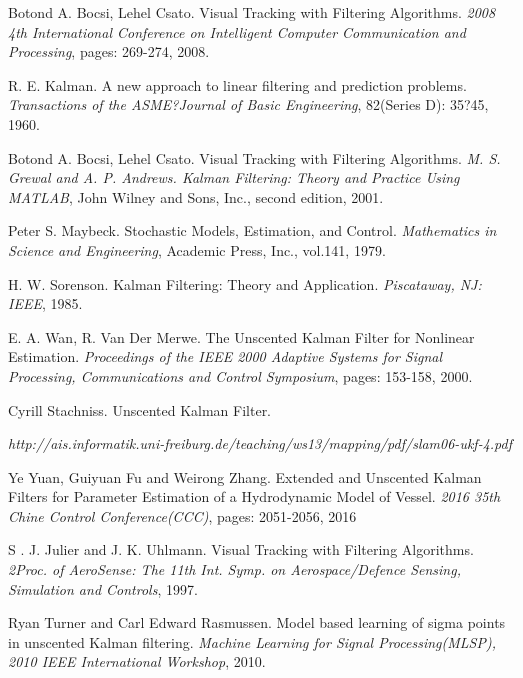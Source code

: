 \documentclass[10pt,twocolumn,letterpaper]{article}
\begin{document}
\begin{thebibliography}{1}
 Botond A. Bocsi, Lehel Csato. Visual Tracking with Filtering Algorithms.
 \emph{2008 4th International Conference on Intelligent Computer Communication and Processing}, pages: 269-274, 2008.

 R. E. Kalman. A new approach to linear filtering and prediction problems.
 \emph{Transactions of the ASME?Journal of Basic Engineering}, 82(Series D): 35?45, 1960.

 Botond A. Bocsi, Lehel Csato. Visual Tracking with Filtering Algorithms.
 \emph{M. S. Grewal and A. P. Andrews. Kalman Filtering: Theory and Practice Using MATLAB}, John Wilney and Sons, Inc., second edition, 2001.

 Peter S. Maybeck. Stochastic Models, Estimation, and Control.
 \emph{Mathematics in Science and Engineering}, Academic Press, Inc., vol.141, 1979.

 H. W. Sorenson. Kalman Filtering: Theory and Application.
 \emph{Piscataway, NJ: IEEE}, 1985.

 E. A. Wan, R. Van Der Merwe. The Unscented Kalman Filter for Nonlinear Estimation.
 \emph{Proceedings of the IEEE 2000 Adaptive Systems for Signal Processing, Communications and Control Symposium}, pages: 153-158, 2000.

 Cyrill Stachniss. Unscented Kalman Filter.

 \emph{http://ais.informatik.uni-freiburg.de/teaching/ws13/mapping/pdf/slam06-ukf-4.pdf}

 Ye Yuan, Guiyuan Fu and Weirong Zhang. Extended and Unscented Kalman Filters for Parameter Estimation of a Hydrodynamic Model of Vessel.
 \emph{2016 35th Chine Control Conference(CCC)}, pages: 2051-2056, 2016

 S . J. Julier and J. K. Uhlmann. Visual Tracking with Filtering Algorithms.
 \emph{2Proc. of AeroSense: The 11th Int. Symp. on Aerospace/Defence Sensing, Simulation and Controls}, 1997.

 Ryan Turner and Carl Edward Rasmussen. Model based learning of sigma points in unscented Kalman filtering.
 \emph{Machine Learning for Signal Processing(MLSP), 2010 IEEE International Workshop}, 2010.


\end{thebibliography}
\end{document}
